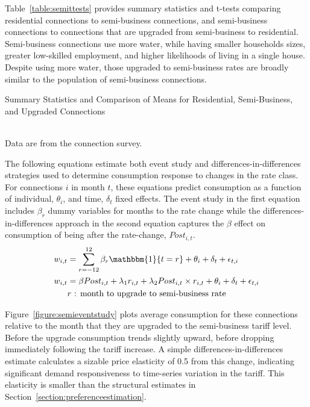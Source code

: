 \documentclass[12pt]{article}
\begin{document}
\begin{appendices}
Table~\ref{table:semittests} provides summary statistics and t-tests comparing residential connections to semi-business connections, and semi-business connections to connections that are upgraded from semi-business to residential.  Semi-business connections use more water, while having smaller households sizes, greater low-skilled employment, and higher likelihoods of living in a single house.  Despite using more water, those upgraded to semi-business rates are broadly similar to the population of semi-business connections.  

\begin{table}
\centering
\caption{Summary Statistics and Comparison of Means for Residential, Semi-Business, and Upgraded Connections}\label{table:semittests}
\resizebox{\textwidth}{!}{  

}\\
\footnotesize{Data are from the connection survey.}
\end{table}

The following equations estimate both event study and differences-in-differences strategies used to determine consumption response to changes in the rate class.  For connections $i$ in month $t$, these equations predict consumption as a function of individual, $\theta_i$, and time, $\delta_t$ fixed effects.  The event study in the first equation includes $\beta_r$ dummy variables for months to the rate change while the differences-in-differences approach in the second equation captures the $\beta$ effect on consumption of being after the rate-change, $Post_{i,t}$.
\begin{align*}
w_{i,t} &= \sum_{r=-12}^{12} \beta_{r} \mathbbm{1} \{t=r\}  +  \theta_{i} +\delta_t + \epsilon_{t,i} \\
w_{i,t} &= \beta Post_{i,t} +  \lambda_{1} r_{i,t} + \lambda_{2} Post_{i,t} \times r_{i,t} + \theta_{i} +\delta_t  + \epsilon_{t,i}\\
&r \text{ : month to upgrade to semi-business rate}
\end{align*}

Figure~\ref{figure:semieventstudy} plots average consumption for these connections relative to the month that they are upgraded to the semi-business tariff level.  Before the upgrade consumption trends slightly upward, before dropping immediately following the tariff increase.  A simple differences-in-differences estimate calculates a sizable price elasticity of 0.5 from this change, indicating significant demand responsiveness to time-series variation in the tariff.  This elasticity is smaller than the structural estimates in Section~\ref{section:preferenceestimation}.


\end{appendices}
\end{document}
